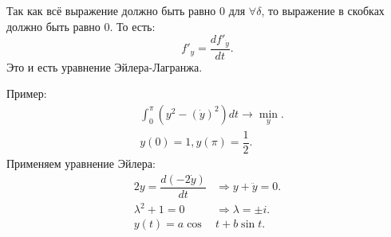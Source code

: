 \documentclass[10pt, a4paper]{extarticle}
\begin{document}
Так как всё выражение должно быть равно 0 для $\forall \delta$, то выражение в скобках должно быть равно 0. То есть:
\[
f'_y = \dfrac{df'_{\dot{y}}}{dt}.
\]
Это и есть уравнение Эйлера-Лагранжа.

Пример:
\begin{align*}
	&\int_{0}^{\pi} (y^2 - (\dot{y})^2)dt \rightarrow \min_y. \\
	&y(0) = 1, y(\pi) = \dfrac{1}{2}.
\end{align*}
Применяем уравнение Эйлера:
\begin{align*}
	2y = \dfrac{d(-2\dot{y})}{dt} &\Rightarrow y + \ddot{y} = 0. \\
	\lambda^2 + 1 = 0 &\Rightarrow \lambda = \pm i. \\
	y(t) = a\cos &t + b\sin t.
\end{align*}
\end{document}
